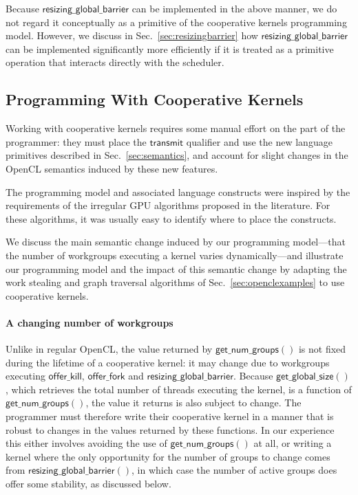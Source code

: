 \documentclass[numbers,nocopyrightspace,10pt]{sigplanconf}
\newcommand{\mysec}{Sec.~}
\newcommand{\transmit}{\mathsf{transmit}}
\newcommand{\offerfork}{\mathsf{offer\_fork}}
\newcommand{\offerkill}{\mathsf{offer\_kill}}
\newcommand{\resizingglobalbarrier}{\mathsf{resizing\_global\_barrier}}
\newcommand{\getnumgroups}{\mathsf{get\_num\_groups}}
\newcommand{\getglobalsize}{\mathsf{get\_global\_size}}
\begin{document}
Because $\resizingglobalbarrier$ can be implemented in the above
manner, we do not regard it conceptually as a primitive of the
cooperative kernels programming model.  However, we discuss in
\mysec\ref{sec:resizingbarrier} how $\resizingglobalbarrier$ can be
implemented significantly more efficiently if it is treated as a
primitive operation that interacts directly with the scheduler.

\subsection{Programming With Cooperative Kernels}\label{sec:programmingguidelines}

Working with cooperative kernels requires some manual effort on the
part of the programmer: they must place the $\transmit$ qualifier and
use the new language primitives described in
\mysec\ref{sec:semantics}, and account for slight changes in the OpenCL semantics induced by these new features.

The programming model and associated language constructs were inspired
by the requirements of the irregular GPU algorithms proposed in the
literature.  For these algorithms, it was usually easy to identify
where to place the constructs.

We discuss the main semantic change induced by our programming
model---that the number of workgroups executing a kernel varies
dynamically---and illustrate our programming model and the impact of
this semantic change by adapting the work stealing and graph traversal
algorithms of \mysec\ref{sec:openclexamples} to use cooperative
kernels.

\paragraph{A changing number of workgroups}  Unlike in regular OpenCL,
the value returned by $\getnumgroups()$ is not fixed during the
lifetime of a cooperative kernel: it may change due to workgroups executing
$\offerkill$, $\offerfork$ and $\resizingglobalbarrier$.  Because $\getglobalsize()$, which retrieves the total number of threads executing the kernel, is
a function of $\getnumgroups()$, the value it returns is also subject to change.
The programmer
must therefore write their cooperative kernel in a manner that is
robust to changes in the values returned by these functions.  In our experience this either involves avoiding the use of $\getnumgroups()$ at all, or writing a kernel where the only opportunity for the number of groups to change comes from $\resizingglobalbarrier()$, in which case the number of active groups does offer some stability, as discussed below.
\end{document}
